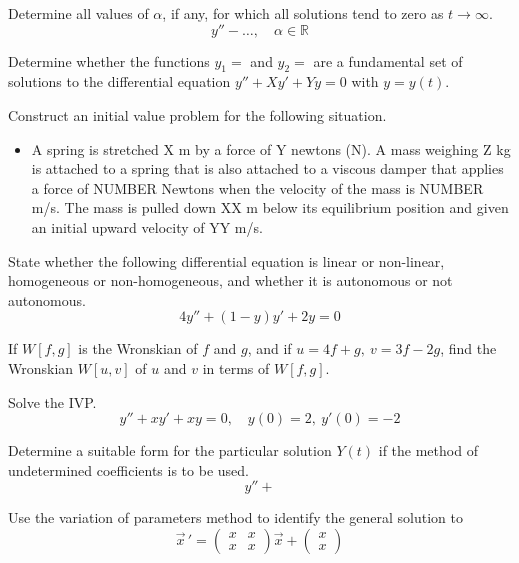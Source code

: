 \documentclass[12pt]{exam}
\begin{document}
    


\newpage


\Initials

\begin{questions}

    \question[2] Determine all values of $\alpha$, if any, for which all solutions tend to zero as $t\to\infty$. $$y'' - \ldots , \quad \alpha \in \mathbb R$$ \vspace{4cm}  
    
    \question[2] Determine whether the functions $y_1 = $ and $y_2 = $ are a fundamental set of solutions to the differential equation $y''+Xy'+Yy = 0$ with $y=y(t)$. 
    
    \vspace{6cm}
    
    \question[2] Construct an initial value problem for the following situation. 

    \begin{itemize}
        \item[] A spring is stretched X m by a force of Y newtons (N). A mass weighing Z kg is attached to a spring that is also attached to a viscous damper that applies a force of NUMBER Newtons when the velocity of the mass is NUMBER m/s. The mass is pulled down XX m below its equilibrium position and given an initial upward velocity of YY m/s. 
    \end{itemize}
    
    \question[1] State whether the following differential equation is linear or non-linear, homogeneous or non-homogeneous, and whether it is autonomous or not autonomous. 
    $$4y'' + (1-y)y' + 2y =0 $$
    
    \question[2] If $W[f, g]$ is the Wronskian of $f$ and $g$, and if $u=4f+g, \ v=3f-2g$, find the Wronskian $W[u,v]$ of $u$ and $v$ in terms of $W [ f , g]$.
    
    \question[4] Solve the IVP.
    $$y''+xy'+xy=0,\quad y(0)=2,\ y'(0)=-2$$
    
    \question[4] Determine a suitable form for the particular solution \(Y(t)\) if the method of undetermined coefficients is to be used. 
    $$y''+ $$
    
    \newpage 

    \question[8] Use the variation of parameters method to identify the general solution to \[\vec{x} \, ' = \left( \begin{array}{rr} x & x \\ x & x \end{array} \right) \vec{x}  + \left( \begin{array}{r}  x \\ x \end{array} \right)  \]
    

\end{questions}
\end{document}
